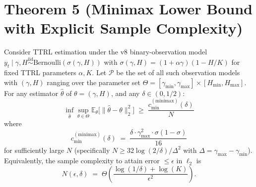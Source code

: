 %
%
%

\section*{Theorem 5 (Minimax Lower Bound with Explicit Sample Complexity)}

\begin{theorem}
\label{thm:T5}
Consider TTRL estimation under the v8 binary-observation model
$y_t \mid \gamma, H \stackrel{\mathrm{iid}}{\sim} \mathrm{Bernoulli}(\sigma(\gamma, H))$
with $\sigma(\gamma, H) = (1 + \alpha \gamma) (1 - H/K)$ for fixed TTRL
parameters $\alpha, K$. Let $\mathcal{P}$ be the set of all such observation
models with $(\gamma, H)$ ranging over the parameter set
$\Theta = [\gamma_{\min}, \gamma_{\max}] \times [H_{\min}, H_{\max}]$.
For any estimator $\hat\theta$ of $\theta = (\gamma, H)$, and any
$\delta \in (0, 1/2)$:
\[
  \inf_{\hat\theta} \sup_{\theta \in \Theta} \mathbb{E}_\theta\!\bigl[
    \|\hat\theta - \theta\|_2^2
  \bigr]
  \;\ge\; \frac{c_{\min}^{(\mathrm{minimax})}(\delta)}{N}
\]
where
\[
  c_{\min}^{(\mathrm{minimax})}(\delta)
    \;=\; \frac{\delta \cdot \gamma_{\max}^2 \cdot \sigma(1-\sigma)}{16}
\]
for sufficiently large $N$ (specifically $N \ge 32 \log(2/\delta) / \Delta^2$
with $\Delta = \gamma_{\max} - \gamma_{\min}$). Equivalently, the sample
complexity to attain error $\le \epsilon$ in $\ell_2$ is
\[
  N(\epsilon, \delta)
    \;=\; \Theta\!\left(
      \frac{\log(1/\delta) + \log(K)}{\epsilon^2}
    \right).
\tag{NC}
\]
\end{theorem}

